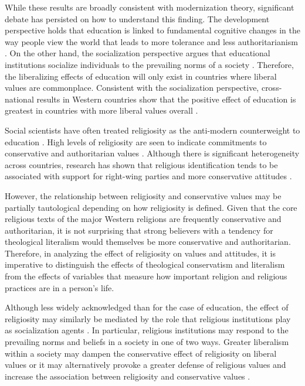 \documentclass[10pt,letterpaper]{article}
\begin{document}
While these results are broadly consistent with modernization theory,
significant debate has persisted on how to understand this finding. The
development perspective holds that education is linked to fundamental
cognitive changes in the way people view the world that leads to more
tolerance and less authoritarianism
\cite{adorno_authoritarian_1950, mcclosky_dimensions_1983}. On the
other hand, the socialization perspective argues that educational
institutions socialize individuals to the prevailing norms of a society
\cite{selznick_tenacity_1969, jackman_education_1984, phelan_education_1995}.
Therefore, the liberalizing effects of education will only exist in
countries where liberal values are commonplace. Consistent with the
socialization perspective, cross-national results in Western countries
show that the positive effect of education is greatest in countries with
more liberal values overall \cite{weil_variable_1985}.

Social scientists have often treated religiosity as the anti-modern
counterweight to education \cite{schwadel_explaining_2015}. High levels
of religiosity are seen to indicate commitments to conservative and
authoritarian values
\cite[p.~27]{rokeach_part_1969, rokeach_part_1969a, wilcox_evangelicals_1990}.
Although there is significant heterogeneity across countries, research
has shown that religious identification tends to be associated with
support for right-wing parties and more conservative attitudes
\cite[pp.~201-212]{wilcox_evangelicals_1990, kelley_class_1995, scheepers_religion_1998, karpov_religiosity_2002, norris_sacred_2011}.

However, the relationship between religiosity and conservative values
may be partially tautological depending on how religiosity is defined.
Given that the core religious texts of the major Western religions are
frequently conservative and authoritarian, it is not surprising that
strong believers with a tendency for theological literalism would
themselves be more conservative and authoritarian. Therefore, in
analyzing the effect of religiosity on values and attitudes, it is
imperative to distinguish the effects of theological conservatism and
literalism from the effects of variables that measure how important
religion and religious practices are in a person's life.

Although less widely acknowledged than for the case of education, the
effect of religiosity may similarly be mediated by the role that
religious institutions play as socialization agents
\cite{scheepers_education_2002}. In particular, religious institutions
may respond to the prevailing norms and beliefs in a society in one of
two ways. Greater liberalism within a society may dampen the
conservative effect of religiosity on liberal values or it may
alternatively provoke a greater defense of religious values and increase
the association between religiosity and conservative values
\cite{kelley_national_1997}.
\end{document}
